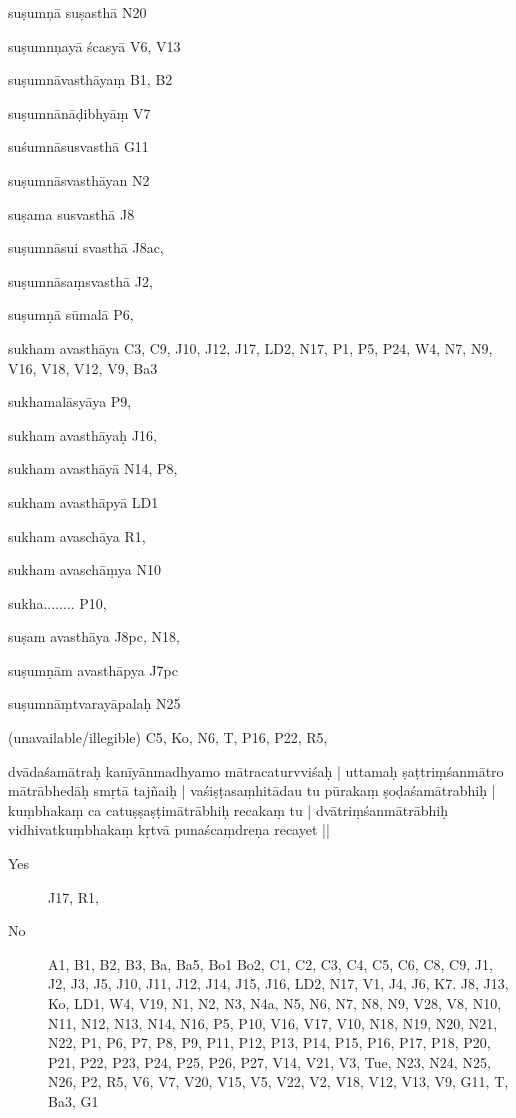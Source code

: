 \begin{ekdosis}
\begin{marma}[hp01_055]
\begin{marma}[hp02_006]
\item[suṣumņā suṣasthā] N20
\item[suṣumnņayā ścasyā] V6, V13
\item[suṣumnāvasthāyaṃ] B1, B2
\item[suṣumnānāḍibhyāṃ] V7
\item[suśumnāsusvasthā] G11
\item[suṣumnāsvasthāyan] N2
\item[suṣama susvasthā] J8
\item[suṣumnāsui svasthā] J8ac,
\item[suṣumnāsaṃsvasthā] J2,
\item[suṣumṇā sūmalā] P6,
\item[sukham avasthāya] C3, C9, J10, J12, J17, LD2, N17, P1, P5, P24, W4, N7, N9, V16, V18, V12, V9, Ba3
\item[sukhamalāsyāya] P9, 
\item[sukham avasthāyaḥ] J16,
\item[sukham avasthāyā] N14, P8, 
\item[sukham avasthāpyā] LD1
\item[sukham avaschāya] R1,
\item[sukham avaschāṃya] N10
\item[sukha........] P10,
\item[suṣam avasthāya] J8pc, N18,
\item[suṣumṇām avasthāpya] J7pc
\item[suṣumnāṃtvarayāpalaḥ] N25
\item[(unavailable/illegible)] C5, Ko, N6, T, P16, P22, R5, 

  \begin{description}

    \end{description}
 \end{marma}


\begin{marma}[hp02_009]
dvādaśamātraḥ kanīyānmadhyamo mātracaturvviśaḥ |
uttamaḥ ṣaṭtriṃśanmātro mātrābhedāḥ smṛtā tajñaiḥ |
vaśiṣṭasaṃhitādau tu pūrakaṃ ṣoḍaśamātrabhiḥ |
kuṃbhakaṃ ca catuṣṣaṣṭimātrābhiḥ recakaṃ tu |
dvātriṃśanmātrābhiḥ vidhivatkuṃbhakaṃ kṛtvā punaścaṃdreṇa recayet ||
\begin{description}
\item[Yes] J17, R1, 
\item[No] A1, B1, B2, B3, Ba, Ba5, Bo1 Bo2, C1, C2, C3, C4, C5, C6, C8, C9, J1, J2, J3, J5, J10, J11, J12, J14, J15, J16, LD2, N17, V1, J4, J6, K7. J8, J13, Ko, LD1, W4, V19, N1, N2, N3, N4a, N5, N6, N7, N8, N9, V28, V8, N10, N11, N12, N13, N14, N16, P5, P10, V16, V17, V10, N18, N19, N20, N21, N22, P1, P6, P7, P8, P9, P11, P12, P13, P14, P15, P16, P17, P18, P20, P21, P22, P23, P24, P25, P26, P27, V14, V21, V3, Tue, N23, N24, N25, N26, P2, R5, V6, V7, V20, V15, V5, V22, V2, V18, V12, V13, V9, G11, T, Ba3, G1
    \end{description}


\end{marma}
\end{marma}
\end{ekdosis}
